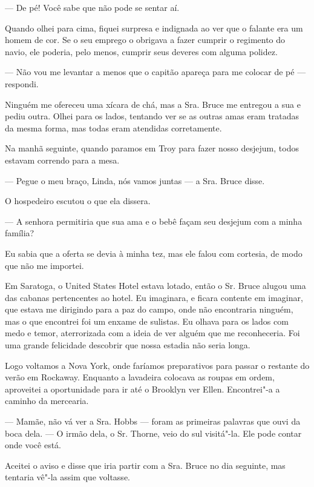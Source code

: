 --- De pé! Você sabe que não pode se sentar aí.

Quando olhei para cima, fiquei surpresa e indignada ao ver que o falante
era um homem de cor. Se o seu emprego o obrigava a fazer cumprir o
regimento do navio, ele poderia, pelo menos, cumprir seus deveres com
alguma polidez.

--- Não vou me levantar a menos que o capitão apareça para me colocar de
pé --- respondi.

Ninguém me ofereceu uma xícara de chá, mas a Sra. Bruce me entregou a
sua e pediu outra. Olhei para os lados, tentando ver se as outras amas
eram tratadas da mesma forma, mas todas eram atendidas corretamente.

Na manhã seguinte, quando paramos em
Troy para fazer nosso desjejum, todos estavam correndo para a mesa.

--- Pegue o meu braço, Linda, nós vamos juntas --- a Sra. Bruce disse.

O hospedeiro escutou o que ela dissera.

--- A senhora permitiria que sua ama e o bebê façam seu desjejum com a
minha família?

Eu sabia que a oferta se devia à minha tez, mas ele falou com cortesia,
de modo que não me importei.

Em Saratoga, o United States Hotel
estava lotado, então o Sr. Bruce alugou uma das cabanas pertencentes ao
hotel. Eu imaginara, e ficara contente em imaginar, que estava me
dirigindo para a paz do campo, onde não encontraria ninguém, mas o que
encontrei foi um enxame de sulistas. Eu olhava para os lados com medo e
temor, aterrorizada com a ideia de ver alguém que me reconheceria. Foi
uma grande felicidade descobrir que nossa estadia não seria longa.

Logo voltamos a Nova York, onde
faríamos preparativos para passar o restante do verão em Rockaway.
Enquanto a lavadeira colocava as roupas em ordem, aproveitei a
oportunidade para ir até o Brooklyn ver Ellen. Encontrei"-a a caminho da
mercearia.

--- Mamãe, não vá ver a Sra. Hobbs --- foram as primeiras palavras que
ouvi da boca dela. --- O irmão dela, o Sr. Thorne, veio do sul
visitá"-la. Ele pode contar onde você está.

Aceitei o aviso e disse que iria partir com a Sra. Bruce no dia
seguinte, mas tentaria vê"-la assim que voltasse.

